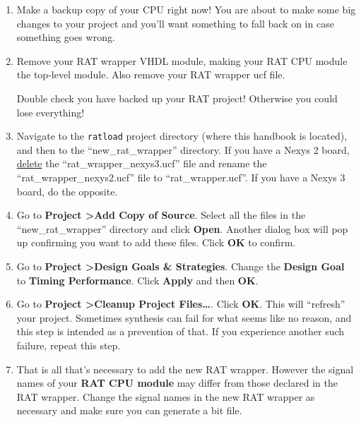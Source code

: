 \documentclass[notitlepage]{article}
\newcommand{\warningsign}{\fontencoding{U}\fontfamily{futs}\Large\selectfont\char 66\relax}
\begin{document}
\begin {enumerate}

\item Make a backup copy of your CPU right now! You are about to make some big changes to your project and you'll want something to fall back on in case something goes wrong.

\item Remove your RAT wrapper VHDL module, making your RAT CPU module the top-level module. Also remove your RAT wrapper ucf file.

\begin{infobox}
  {\warningsign} Double check you have backed up your RAT project! Otherwise you could lose everything!
\end{infobox}

\item Navigate to the \texttt{ratload} project directory (where this handbook is located), and then to the ``new\_rat\_wrapper'' directory. If you have a Nexys 2 board, \underline{delete} the ``rat\_wrapper\_nexys3.ucf'' file and rename the ``rat\_wrapper\_nexys2.ucf'' file to ``rat\_wrapper.ucf''. If you have a Nexys 3 board, do the opposite.

\item Go to \textbf{Project \textgreater Add Copy of Source}. Select all the files in the ``new\_rat\_wrapper'' directory and click \textbf{Open}. Another dialog box will pop up confirming you want to add these files. Click \textbf{OK} to confirm.

\item Go to \textbf{Project \textgreater Design Goals \& Strategies}. Change the \textbf{Design Goal} to \textbf{Timing Performance}. Click \textbf{Apply} and then \textbf{OK}.

\item Go to \textbf{Project \textgreater Cleanup Project Files\ldots}. Click \textbf{OK}. This will ``refresh'' your project. Sometimes synthesis can fail for what seems like no reason, and this step is intended as a prevention of that. If you experience another such failure, repeat this step.

\item That is all that's necessary to add the new RAT wrapper. However the signal names of your \textbf{RAT CPU module} may differ from those declared in the RAT wrapper. Change the signal names in the new RAT wrapper as necessary and make sure you can generate a bit file.
\end{enumerate}
\end{document}
